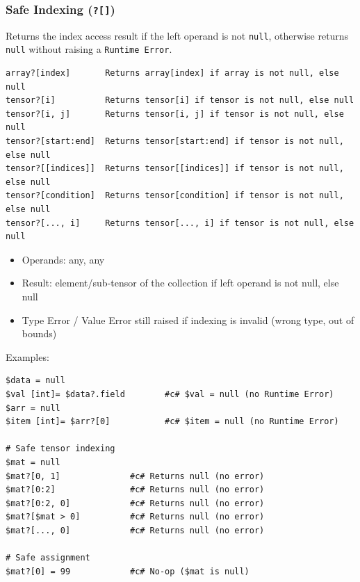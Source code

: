 \subsubsection{Safe Indexing (\texttt{?[]})}
Returns the index access result if the left operand is not \texttt{null}, otherwise returns \texttt{null} without raising a \texttt{Runtime Error}.
\begin{verbatim}
array?[index]       Returns array[index] if array is not null, else null
tensor?[i]          Returns tensor[i] if tensor is not null, else null
tensor?[i, j]       Returns tensor[i, j] if tensor is not null, else null
tensor?[start:end]  Returns tensor[start:end] if tensor is not null, else null
tensor?[[indices]]  Returns tensor[[indices]] if tensor is not null, else null
tensor?[condition]  Returns tensor[condition] if tensor is not null, else null
tensor?[..., i]     Returns tensor[..., i] if tensor is not null, else null
\end{verbatim}
\begin{itemize}
\item Operands: any, any
\item Result: element/sub-tensor of the collection if left operand is not null, else null
\item Type Error / Value Error still raised if indexing is invalid (wrong type, out of bounds)
\end{itemize}

Examples:
\begin{verbatim}
$data = null
$val [int]= $data?.field        #c# $val = null (no Runtime Error)
$arr = null
$item [int]= $arr?[0]           #c# $item = null (no Runtime Error)

# Safe tensor indexing
$mat = null
$mat?[0, 1]              #c# Returns null (no error)
$mat?[0:2]               #c# Returns null (no error)
$mat?[0:2, 0]            #c# Returns null (no error)
$mat?[$mat > 0]          #c# Returns null (no error)
$mat?[..., 0]            #c# Returns null (no error)

# Safe assignment
$mat?[0] = 99            #c# No-op ($mat is null)
\end{verbatim}

